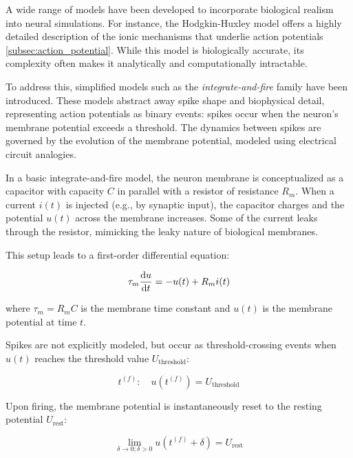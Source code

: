 A wide range of models have been developed to incorporate biological realism into neural simulations. For instance, the Hodgkin-Huxley model \citep{hodgkin1952quantitative} offers a highly detailed description of the ionic mechanisms that underlie action potentials \ref{subsec:action_potential}. While this model is biologically accurate, its complexity often makes it analytically and computationally intractable.

To address this, simplified models such as the \emph{integrate-and-fire} family have been introduced. These models abstract away spike shape and biophysical detail, representing action potentials as binary events: spikes occur when the neuron's membrane potential exceeds a threshold. The dynamics between spikes are governed by the evolution of the membrane potential, modeled using electrical circuit analogies.

In a basic integrate-and-fire model, the neuron membrane is conceptualized as a capacitor with capacity $C$ in parallel with a resistor of resistance $R_m$. When a current $i(t)$ is injected (e.g., by synaptic input), the capacitor charges and the potential $u(t)$ across the membrane increases. Some of the current leaks through the resistor, mimicking the leaky nature of biological membranes.

This setup leads to a first-order differential equation:


\begin{equation}
    \tau_{m} \odv{u}{t} = -u(t) + R_{m}i(t)
\end{equation}
\label{eq:integrate_and_fire}

where $\tau_m = R_m C$ is the membrane time constant and $u(t)$ is the membrane potential at time $t$.

Spikes are not explicitly modeled, but occur as threshold-crossing events when $u(t)$ reaches the threshold value $U_{\text{threshold}}$:

\begin{equation}
    t^{(f)}: \quad u(t^{(f)}) = U_{\text{threshold}}
\end{equation}
\label{eq:firing_time}

Upon firing, the membrane potential is instantaneously reset to the resting potential $U_{\text{rest}}$:

\begin{equation}
    \lim_{\delta \to 0; \delta > 0} u\left( t^{(f)} + \delta \right) = U_{\text{rest}}
\end{equation}
\label{eq:resting_potential}

